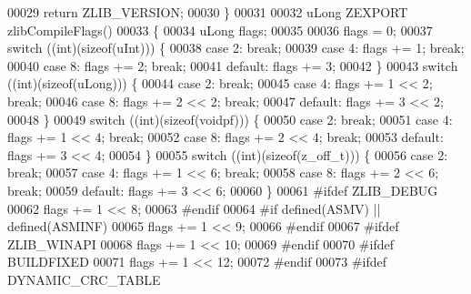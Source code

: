 \begin{DoxyCode}
00029     \textcolor{keywordflow}{return} ZLIB\_VERSION;
00030 \}
00031 
00032 uLong ZEXPORT zlibCompileFlags()
00033 \{
00034     uLong flags;
00035 
00036     flags = 0;
00037     \textcolor{keywordflow}{switch} ((\textcolor{keywordtype}{int})(\textcolor{keyword}{sizeof}(uInt))) \{
00038     \textcolor{keywordflow}{case} 2:     \textcolor{keywordflow}{break};
00039     \textcolor{keywordflow}{case} 4:     flags += 1;     \textcolor{keywordflow}{break};
00040     \textcolor{keywordflow}{case} 8:     flags += 2;     \textcolor{keywordflow}{break};
00041     \textcolor{keywordflow}{default}:    flags += 3;
00042     \}
00043     \textcolor{keywordflow}{switch} ((\textcolor{keywordtype}{int})(\textcolor{keyword}{sizeof}(uLong))) \{
00044     \textcolor{keywordflow}{case} 2:     \textcolor{keywordflow}{break};
00045     \textcolor{keywordflow}{case} 4:     flags += 1 << 2;        \textcolor{keywordflow}{break};
00046     \textcolor{keywordflow}{case} 8:     flags += 2 << 2;        \textcolor{keywordflow}{break};
00047     \textcolor{keywordflow}{default}:    flags += 3 << 2;
00048     \}
00049     \textcolor{keywordflow}{switch} ((\textcolor{keywordtype}{int})(\textcolor{keyword}{sizeof}(voidpf))) \{
00050     \textcolor{keywordflow}{case} 2:     \textcolor{keywordflow}{break};
00051     \textcolor{keywordflow}{case} 4:     flags += 1 << 4;        \textcolor{keywordflow}{break};
00052     \textcolor{keywordflow}{case} 8:     flags += 2 << 4;        \textcolor{keywordflow}{break};
00053     \textcolor{keywordflow}{default}:    flags += 3 << 4;
00054     \}
00055     \textcolor{keywordflow}{switch} ((\textcolor{keywordtype}{int})(\textcolor{keyword}{sizeof}(z\_off\_t))) \{
00056     \textcolor{keywordflow}{case} 2:     \textcolor{keywordflow}{break};
00057     \textcolor{keywordflow}{case} 4:     flags += 1 << 6;        \textcolor{keywordflow}{break};
00058     \textcolor{keywordflow}{case} 8:     flags += 2 << 6;        \textcolor{keywordflow}{break};
00059     \textcolor{keywordflow}{default}:    flags += 3 << 6;
00060     \}
00061 \textcolor{preprocessor}{#ifdef ZLIB\_DEBUG}
00062     flags += 1 << 8;
00063 \textcolor{preprocessor}{#endif}
00064 \textcolor{preprocessor}{#if defined(ASMV) || defined(ASMINF)}
00065     flags += 1 << 9;
00066 \textcolor{preprocessor}{#endif}
00067 \textcolor{preprocessor}{#ifdef ZLIB\_WINAPI}
00068     flags += 1 << 10;
00069 \textcolor{preprocessor}{#endif}
00070 \textcolor{preprocessor}{#ifdef BUILDFIXED}
00071     flags += 1 << 12;
00072 \textcolor{preprocessor}{#endif}
00073 \textcolor{preprocessor}{#ifdef DYNAMIC\_CRC\_TABLE}

\end{DoxyCode}

